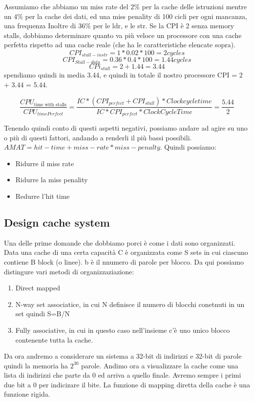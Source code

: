 \begin{example}
    Assumiamo che abbiamo un miss rate del \(2\%\) per la cache delle istruzioni mentre un \(4\%\) per la cache dei dati, ed una miss penality di 100 cicli per ogni mancanza, una frequenza Inoltre
    di \(36\%\) per le ldr, e le str. Se la CPI è 2 senza memory stalls, dobbiamo determinare quanto va più veloce un processore con una cache perfetta rispetto ad una cache reale (che ha le caratteristiche elencate sopra).\\

    \[CPI_{stall-instr} = 1 * 0.02 * 100 = 2 cycles\]
    \[CPI_{Stall-data} = 0.36 * 0.4 * 100 = 1.44 cycles\]
    \[CPi_{stall} = 2 + 1.44 = 3.44\]
    spendiamo quindi in media 3.44, e quindi in totale il nostro processore CPI = 2 + 3.44 = 5.44.

    \[\frac{CPU_{\text{time with stalls}}}{CPU_{time Perfect}} = \frac{IC * (CPI_{perfect} + CPI_{stall}) * Clockcycletime}{IC * CPI_{perfect} * ClockCycleTime} =  \frac{5.44}{2}\]
\end{example}

Tenendo quindi conto di questi aspetti negativi, possiamo andare ad agire su uno o più di questi fattori, andando a renderli il più bassi possibili.
\(AMAT = hit-time + miss-rate * miss-penalty\). Quindi possiamo:
\begin{itemize}
    \item Ridurre il miss rate
    \item Ridurre la miss penality
    \item Redurre l'hit time
\end{itemize}

\subsection{Design cache system}
Una delle prime domande che dobbiamo porci è come i dati sono organizzati.\\
Data una cache di una certa capacità C è organizzata come S sets in cui ciascuno contiene B block (o linee). b è il nnumero di parole per blocco.
Da qui possiamo distingure vari metodi di organizzaziazione:
\begin{enumerate}
    \item Direct mapped
    \item N-way set associatice, in cui N definisce il numero di blocchi conetnuti in un set quindi S=B/N
    \item Fully associative, in cui in questo caso nell'insieme c'è uno unico blocco contenente tutta la cache.
\end{enumerate}
Da ora andremo a considerare un sistema a 32-bit di indirizzi e 32-bit di parole quindi la memoria ha \(2^{30}\) parole.
Andimo ora a visualizzare la cache come una lista di indirizzi che parte da 0 ed arriva a quello finale. Avremo sempre i primi due bit a 0 per indicizare il bite.
La funzione di mapping diretta della cache è una funzione rigida.\\

